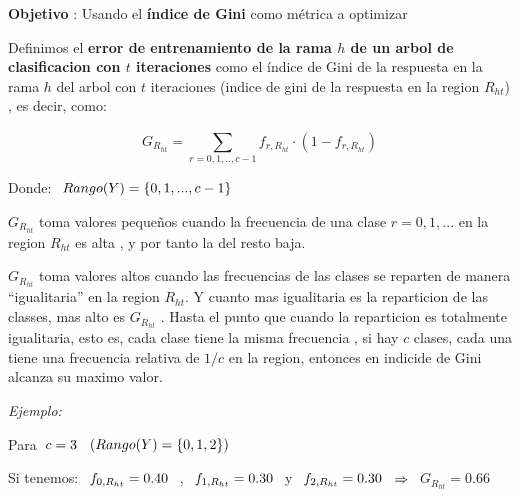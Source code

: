\documentclass[
  11pt,
  a4paper,
]{article}
\begin{document}
\vspace{1.5cm}

\textbf{Objetivo} : Usando el \textbf{índice de Gini} como métrica a
optimizar

\vspace{0.35cm}

Definimos el \textbf{error de entrenamiento de la rama \(h\) de un arbol
de clasificacion con \(t\) iteraciones} como el índice de Gini de la
respuesta en la rama \(h\) del arbol con \(t\) iteraciones (indice de
gini de la respuesta en la region \(R_{ht}\)) , es decir, como:

\[ G_{R_{ht}} = \sum_{r=0,1,..,c-1}^{} f_{r , R_{ht}}\cdot(1 - f_{r , R_{ht}}) \]

\vspace{0.35cm}

Donde: \(\hspace{0.15cm} Rango(Y) = \lbrace 0,1,...,c-1 \rbrace\)

\vspace{0.35cm}

\(G_{R_{ht}}\) toma valores pequeños cuando la frecuencia de una clase
\(r=0,1,...\) en la region \(R_{ht}\) es alta , y por tanto la del resto
baja.

\(G_{R_{ht}}\) toma valores altos cuando las frecuencias de las clases
se reparten de manera ``igualitaria'' en la region \(R_{ht}\). Y cuanto
mas igualitaria es la reparticion de las classes, mas alto es
\(G_{R_{ht}}\) . Hasta el punto que cuando la reparticion es totalmente
igualitaria, esto es, cada clase tiene la misma frecuencia , si hay
\(c\) clases, cada una tiene una frecuencia relativa de \(1/c\) en la
region, entonces en indicide de Gini alcanza su maximo valor.

\vspace{0.35cm}

\emph{Ejemplo:}

Para \(\hspace{0.1 cm} c=3\)
\(\hspace{0.15cm} ( Rango(Y)=\lbrace 0,1,2 \rbrace )\)

Si tenemos: \(\hspace{0.15cm} f_{0 , R_{ht}} = 0.40 \hspace{0.15cm}\) ,
\(\hspace{0.15cm} f_{1 , R_{ht}}=0.30 \hspace{0.15cm}\) y
\(\hspace{0.15cm} f_{2 , R_{ht}}=0.30\)
\(\hspace{0.15cm} \Rightarrow \hspace{0.15cm}\) \(G_{R_{ht}} = 0.66\)
\end{document}
